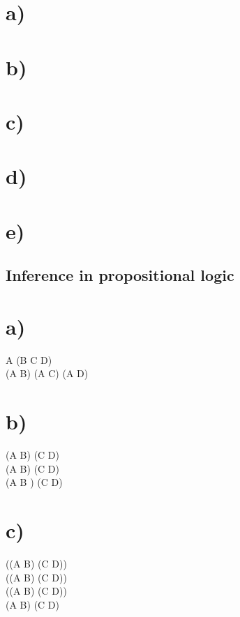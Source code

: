 \documentclass{article}
\begin{document}
\section*{a)}

\section*{b)}

\section*{c)}

\section*{d)}

\section*{e)}

\subsection{Inference in propositional logic}

\section*{a)}
A \vee (B \wedge C \wedge \neg D)\\
(A \vee B) \wedge (A \vee C) \wedge (A \vee \neg D)\\

\section*{b)}
\neg (A \Rightarrow \neg B) \wedge \neg (C \Rightarrow \neg D)\\
\neg (\neg A \vee \neg B) \wedge \neg (\neg C \vee \neg D)\\
(A \vee B ) \wedge (C \vee D)

\section*{c)}
\neg ((A \Rightarrow B) \wedge (C \Rightarrow D))\\
\neg ((\neg A \vee B) \wedge (\neg C \vee D))\\
(\neg (\neg A \vee B) \wedge \neg(\neg C \vee D))\\
(A \vee \neg B) \wedge (C \vee \neg D)
\end{document}
